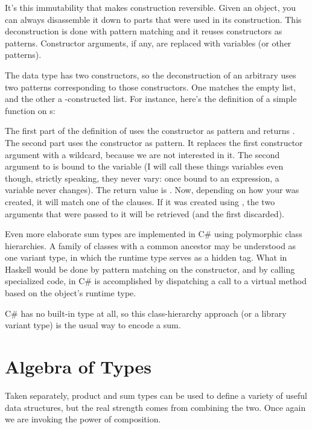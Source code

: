 It's this immutability that makes construction reversible. Given an
object, you can always disassemble it down to parts that were used in
its construction. This deconstruction is done with pattern matching and
it reuses constructors as patterns. Constructor arguments, if any, are
replaced with variables (or other patterns).

The  data type has two constructors, so the deconstruction
of an arbitrary  uses two patterns corresponding to those
constructors. One matches the empty  list, and the other a
-constructed list. For instance, here's the definition of a
simple function on s:

The first part of the definition of  uses the
 constructor as pattern and returns . The
second part uses the  constructor as pattern. It replaces
the first constructor argument with a wildcard, because we are not
interested in it. The second argument to  is bound to the
variable  (I will call these things variables even though,
strictly speaking, they never vary: once bound to an expression, a
variable never changes). The return value is . Now,
depending on how your  was created, it will match one of
the clauses. If it was created using , the two arguments
that were passed to it will be retrieved (and the first discarded).

Even more elaborate sum types are implemented in C\# using polymorphic
class hierarchies. A family of classes with a common ancestor may be
understood as one variant type, in which the runtime type serves as a
hidden tag. What in Haskell would be done by pattern matching on the
constructor, and by calling specialized code, in C\# is accomplished by
dispatching a call to a virtual method based on the object's runtime
type.

C\# has no built-in  type at all, so this class-hierarchy
approach (or a library variant type) is the usual way to encode a sum.

\section{Algebra of Types}

Taken separately, product and sum types can be used to define a variety
of useful data structures, but the real strength comes from combining
the two. Once again we are invoking the power of composition.

